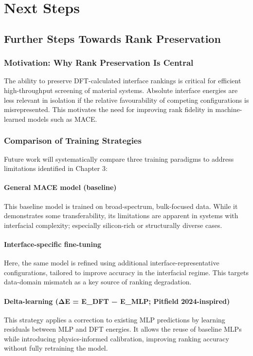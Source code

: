 \chapter{Next Steps}
\label{chapter:next_steps}

\section{Further Steps Towards Rank Preservation}
\label{section:rank_preservation}

\subsection{Motivation: Why Rank Preservation Is Central}
The ability to preserve DFT-calculated interface rankings is critical for efficient high-throughput screening of
material systems. Absolute interface energies are less relevant in isolation if the relative favourability of competing
configurations is misrepresented. This motivates the need for improving rank fidelity in machine-learned models such as
MACE.

\subsection{Comparison of Training Strategies}
Future work will systematically compare three training paradigms to address limitations identified in Chapter 3:

\subsubsection{General MACE model (baseline)}
This baseline model is trained on broad-spectrum, bulk-focused data. While it demonstrates some transferability, its
limitations are apparent in systems with interfacial complexity; especially silicon-rich or structurally diverse cases.

\subsubsection{Interface-specific fine-tuning}
Here, the same model is refined using additional interface-representative configurations, tailored to improve accuracy
in the interfacial regime. This targets data-domain mismatch as a key source of ranking degradation.

\subsubsection{Delta-learning (ΔE = E\_DFT − E\_MLP; Pitfield 2024-inspired)}
This strategy applies a correction to existing MLP predictions by learning residuals between MLP and DFT energies. It
allows the reuse of baseline MLPs while introducing physics-informed calibration, improving ranking accuracy without
fully retraining the model.

